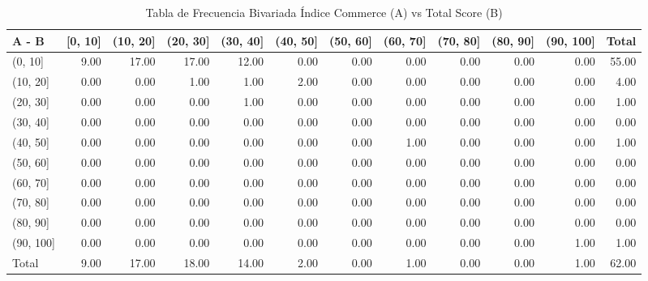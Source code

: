 \documentclass[
]{article}
\begin{document}
\renewcommand{\arraystretch}{1.3}
\begin{scriptsize}%
\begin{longtable}{lrrrrrrrrrrr}
\caption{Tabla de Frecuencia Bivariada Índice Commerce (A) vs Total Score (B)} \\ 
  \hline
A   -   B & [0, 10] & (10, 20] & (20, 30] & (30, 40] & (40, 50] & (50, 60] & (60, 70] & (70, 80] & (80, 90] & (90, 100] & Total \\ 
  \hline
(0, 10] & 9.00 & 17.00 & 17.00 & 12.00 & 0.00 & 0.00 & 0.00 & 0.00 & 0.00 & 0.00 & 55.00 \\ 
  (10, 20] & 0.00 & 0.00 & 1.00 & 1.00 & 2.00 & 0.00 & 0.00 & 0.00 & 0.00 & 0.00 & 4.00 \\ 
  (20, 30] & 0.00 & 0.00 & 0.00 & 1.00 & 0.00 & 0.00 & 0.00 & 0.00 & 0.00 & 0.00 & 1.00 \\ 
  (30, 40] & 0.00 & 0.00 & 0.00 & 0.00 & 0.00 & 0.00 & 0.00 & 0.00 & 0.00 & 0.00 & 0.00 \\ 
  (40, 50] & 0.00 & 0.00 & 0.00 & 0.00 & 0.00 & 0.00 & 1.00 & 0.00 & 0.00 & 0.00 & 1.00 \\ 
  (50, 60] & 0.00 & 0.00 & 0.00 & 0.00 & 0.00 & 0.00 & 0.00 & 0.00 & 0.00 & 0.00 & 0.00 \\ 
  (60, 70] & 0.00 & 0.00 & 0.00 & 0.00 & 0.00 & 0.00 & 0.00 & 0.00 & 0.00 & 0.00 & 0.00 \\ 
  (70, 80] & 0.00 & 0.00 & 0.00 & 0.00 & 0.00 & 0.00 & 0.00 & 0.00 & 0.00 & 0.00 & 0.00 \\ 
  (80, 90] & 0.00 & 0.00 & 0.00 & 0.00 & 0.00 & 0.00 & 0.00 & 0.00 & 0.00 & 0.00 & 0.00 \\ 
  (90, 100] & 0.00 & 0.00 & 0.00 & 0.00 & 0.00 & 0.00 & 0.00 & 0.00 & 0.00 & 1.00 & 1.00 \\ 
  Total & 9.00 & 17.00 & 18.00 & 14.00 & 2.00 & 0.00 & 1.00 & 0.00 & 0.00 & 1.00 & 62.00 \\ 
   \hline
\hline
\end{longtable}
\end{scriptsize}\renewcommand{\arraystretch}{1}
\end{document}
